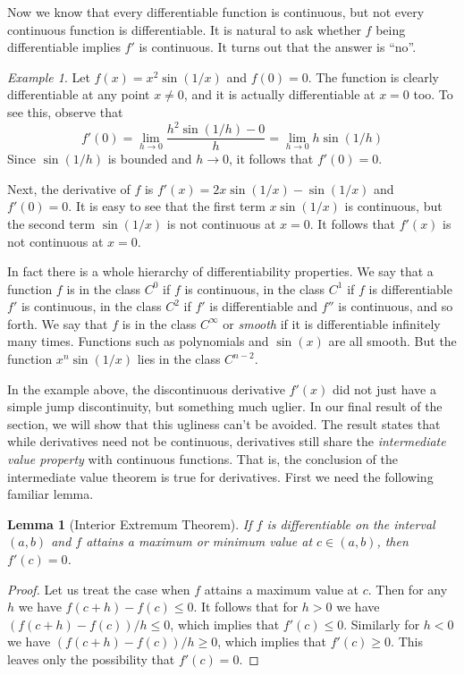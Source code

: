 \documentclass[11pt,oneside]{amsbook}
\theoremstyle{definition}
\theoremstyle{plain}
\newtheorem{lemma}[theorem]{Lemma}
\theoremstyle{definition}
\theoremstyle{remark}
\newtheorem{example}[theorem]{Example}
\numberwithin{equation}{section}
\numberwithin{figure}{section}
\begin{document}
Now we know that every differentiable function is continuous, but not every continuous function is differentiable. It is natural to ask whether $f$ being differentiable implies $f'$ is continuous. It turns out that the answer is ``no''.

\begin{example}
  Let $f(x)=x^2\sin(1/x)$ and $f(0)=0$. The function is clearly differentiable at any point $x\neq0$, and it is actually differentiable at $x=0$ too. To see this, observe that
\[f'(0)=\lim_{h\to0}\frac{h^2\sin(1/h)-0}{h}=\lim_{h\to0}h\sin(1/h)
\]
Since $\sin(1/h)$ is bounded and $h\to 0$, it follows that $f'(0)=0$.

Next, the derivative of $f$ is $f'(x)=2x\sin(1/x)-\sin(1/x)$ and $f'(0)=0$. It is easy to see that the first term $x\sin(1/x)$ is continuous, but the second term $\sin(1/x)$ is not continuous at $x=0$. It follows that $f'(x)$ is not continuous at $x=0$.
\end{example}

In fact there is a whole hierarchy of differentiability properties. We say that a function $f$ is in the class $C^0$ if $f$ is continuous, in the class $C^1$ if $f$ is differentiable $f'$ is continuous, in the class $C^2$ if $f'$ is differentiable and $f''$ is continuous, and so forth. We say that $f$ is in the class $C^\infty$ or \emph{smooth} if it is differentiable infinitely many times. Functions such as polynomials and $\sin(x)$ are all smooth. But the function $x^n\sin(1/x)$ lies in the class $C^{n-2}$.

In the example above, the discontinuous derivative $f'(x)$ did not just have a simple jump discontinuity, but something much uglier. In our final result of the section, we will show that this ugliness can't be avoided. The result states that while derivatives need not be continuous, derivatives still share the \emph{intermediate value property} with continuous functions. That is, the conclusion of the intermediate value theorem is true for derivatives. First we need the following familiar lemma.

\begin{lemma}[Interior Extremum Theorem]
  \label{thm:iet}
  If $f$ is differentiable on the interval $(a,b)$ and $f$ attains a maximum or minimum value at $c\in(a,b)$, then $f'(c)=0$.
\end{lemma}

\begin{proof}
  Let us treat the case when $f$ attains a maximum value at $c$. Then for any $h$ we have $f(c+h)-f(c)\leq0$. It follows that for $h>0$ we have $(f(c+h)-f(c))/h\leq0$, which implies that $f'(c)\leq0$. Similarly for $h<0$ we have $(f(c+h)-f(c))/h\geq0$, which implies that $f'(c)\geq0$. This leaves only the possibility that $f'(c)=0$.
\end{proof}
\end{document}
